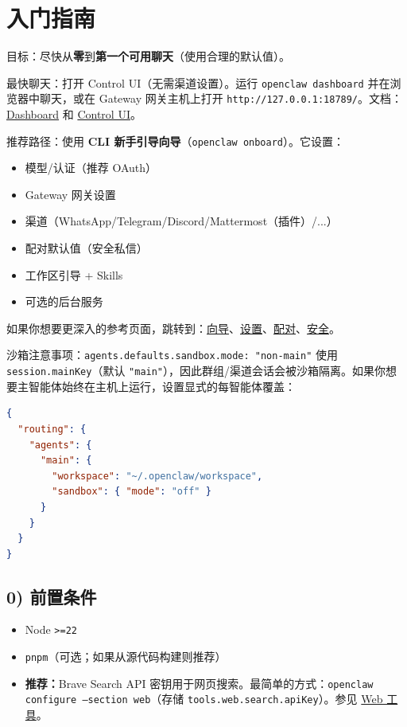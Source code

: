 \clearpage

\section{入门指南}


目标：尽快从\textbf{零}到\textbf{第一个可用聊天}（使用合理的默认值）。

最快聊天：打开 Control UI（无需渠道设置）。运行 \texttt{openclaw dashboard} 并在浏览器中聊天，或在 Gateway 网关主机上打开 \texttt{http://127.0.0.1:18789/}。文档：\href{/web/dashboard}{Dashboard} 和 \href{/web/control-ui}{Control UI}。

推荐路径：使用 \textbf{CLI 新手引导向导}（\texttt{openclaw onboard}）。它设置：

\begin{itemize}
  \item 模型/认证（推荐 OAuth）
  \item Gateway 网关设置
  \item 渠道（WhatsApp/Telegram/Discord/Mattermost（插件）/...）
  \item 配对默认值（安全私信）
  \item 工作区引导 + Skills
  \item 可选的后台服务
\end{itemize}


如果你想要更深入的参考页面，跳转到：\href{/start/wizard}{向导}、\href{/start/setup}{设置}、\href{/channels/pairing}{配对}、\href{/gateway/security}{安全}。

沙箱注意事项：\texttt{agents.defaults.sandbox.mode: "non-main"} 使用 \texttt{session.mainKey}（默认 \texttt{"main"}），因此群组/渠道会话会被沙箱隔离。如果你想要主智能体始终在主机上运行，设置显式的每智能体覆盖：

\begin{lstlisting}[language=json]
{
  "routing": {
    "agents": {
      "main": {
        "workspace": "~/.openclaw/workspace",
        "sandbox": { "mode": "off" }
      }
    }
  }
}
\end{lstlisting}


\subsection{0) 前置条件}


\begin{itemize}
  \item Node \texttt{>=22}
  \item \texttt{pnpm}（可选；如果从源代码构建则推荐）
  \item \textbf{推荐：}Brave Search API 密钥用于网页搜索。最简单的方式：\texttt{openclaw configure --section web}（存储 \texttt{tools.web.search.apiKey}）。参见 \href{/tools/web}{Web 工具}。
\end{itemize}


